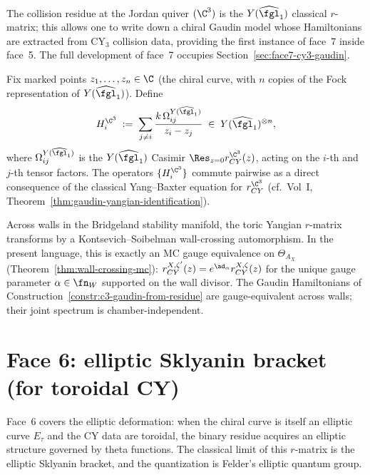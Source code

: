 The collision residue at the Jordan quiver $(\C^3)$ is the
$Y(\widehat{\fgl}_1)$ classical $r$-matrix; this allows one to write
down a chiral Gaudin model whose Hamiltonians are extracted from CY$_3$
collision data, providing the first instance of face~7 inside face~5.
The full development of face~7 occupies
Section~\ref{sec:face7-cy3-gaudin}.

\begin{construction}
\label{constr:c3-gaudin-from-residue}
Fix marked points $z_1, \ldots, z_n \in \C$ (the chiral curve, with $n$
copies of the Fock representation of $Y(\widehat{\fgl}_1)$). Define
\[
 H_i^{\C^3} \;:=\; \sum_{j \neq i} \frac{k\,\Omega_{ij}^{Y(\widehat{\fgl}_1)}}{z_i - z_j}
 \;\in\; Y(\widehat{\fgl}_1)^{\otimes n},
\]
where $\Omega_{ij}^{Y(\widehat{\fgl}_1)}$ is the $Y(\widehat{\fgl}_1)$
Casimir $\Res_{z=0} r_{CY}^{\C^3}(z)$, acting on the $i$-th and $j$-th
tensor factors. The operators $\{H_i^{\C^3}\}$ commute pairwise as a
direct consequence of the classical Yang--Baxter equation for
$r_{CY}^{\C^3}$ (cf.\ Vol~I,
Theorem~\ref{thm:gaudin-yangian-identification}).
\end{construction}

\begin{remark}
\label{rem:c3-wall-crossing-mc-gauge}
Across walls in the Bridgeland stability manifold, the toric Yangian
$r$-matrix transforms by a Kontsevich--Soibelman wall-crossing
automorphism. In the present language, this is exactly an MC gauge
equivalence on $\Theta_{A_X}$ (Theorem~\ref{thm:wall-crossing-mc}):
$r_{CY}^{X,\zeta'}(z) = e^{\ad_\alpha} r_{CY}^{X,\zeta}(z)$ for the
unique gauge parameter $\alpha \in \fn_W$ supported on the wall divisor.
The Gaudin Hamiltonians of
Construction~\ref{constr:c3-gaudin-from-residue} are gauge-equivalent
across walls; their joint spectrum is chamber-independent.
\end{remark}


\section{Face 6: elliptic Sklyanin bracket (for toroidal CY)}
\label{sec:face6-sklyanin}

Face~6 covers the elliptic deformation: when the chiral curve is
itself an elliptic curve $E_\tau$ and the CY data are toroidal, the
binary residue acquires an elliptic structure governed by theta
functions. The classical limit of this $r$-matrix is the elliptic
Sklyanin bracket, and the quantization is Felder's elliptic quantum
group.

